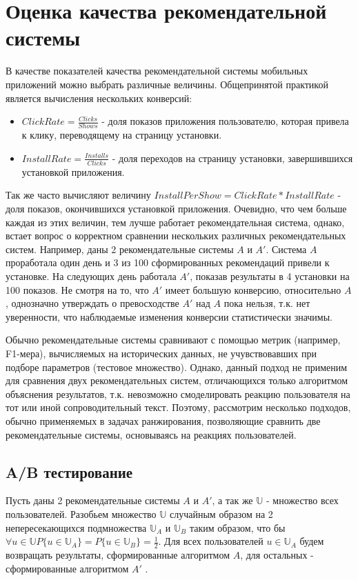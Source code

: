 \documentclass[12pt,a4paper]{report}
\begin{document}
\section{Оценка качества рекомендательной системы}
В качестве показателей качества рекомендательной системы мобильных приложений можно выбрать различные величины. Общепринятой практикой является вычисления нескольких конверсий:
\begin{itemize}
\item $ClickRate = \frac{Clicks}{Shows}$ - доля показов приложения пользователю, которая привела к клику, переводящему на страницу установки.
\item $InstallRate = \frac{Installs}{Clicks}$ - доля переходов на страницу установки, завершившихся установкой приложения.
\end{itemize}
Так же часто вычисляют величину $InstallPerShow = ClickRate * InstallRate$ - доля показов, окончившихся установкой приложения.
Очевидно, что чем больше каждая из этих величин, тем лучше работает рекомендательная система, однако, встает вопрос о корректном сравнении нескольких различных рекомендательных систем.
Например, даны 2 рекомендательные системы $A$ и $A'$. Система $A$ проработала один день и 3 из 100 сформированных рекомендаций привели к установке. На следующих день работала $A'$, показав результаты в 4 установки на 100 показов. Не смотря на то, что $A'$ имеет большую конверсию, относительно $A$, однозначно утверждать о превосходстве $A'$ над $A$ пока нельзя, т.к. нет уверенности, что наблюдаемые изменения конверсии статистически значимы.

Обычно рекомендательные системы сравнивают с помощью метрик (например, F1-мера), вычисляемых на исторических данных, не учувствовавших при подборе параметров (тестовое множество). Однако, данный подход не применим для сравнения двух рекомендательных систем, отличающихся только алгоритмом объяснения результатов, т.к. невозможно смоделировать реакцию пользователя на тот или иной сопроводительный текст. Поэтому, рассмотрим несколько подходов, обычно применяемых в задачах ранжирования, позволяющие сравнить две рекомендательные системы, основываясь на реакциях пользователей.

\subsection{A/B тестирование}
Пусть даны 2 рекомендательные системы $A$ и $A'$, а так же $\mathbb{U}$ - множество всех пользователей. Разобьем множество $\mathbb{U}$ случайным образом на 2 непересекающихся подмножества $\mathbb{U}_A$ и  $\mathbb{U}_B$ таким образом, что бы $\forall u \in \mathbb{U} \textit{P}\{u \in \mathbb{U}_A\} = \textit{P}\{u \in \mathbb{U}_B\} = \frac{1}{2}$.
Для всех пользователей $u \in \mathbb{U}_A$ будем возвращать результаты, сформированные алгоритмом $A$, для остальных - сформированные алгоритмом $A'$ \cite{Ab}.
\end{document}
